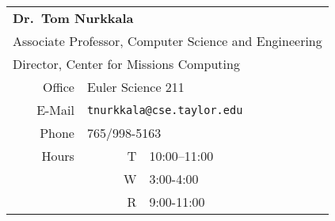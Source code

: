 \begin{tabular}{rrl}
  \toprule
  \multicolumn{3}{l}{\textbf{Dr.\ Tom Nurkkala}}                            \\
  \multicolumn{3}{l}{Associate Professor, Computer Science and Engineering} \\
  \multicolumn{3}{l}{Director, Center for Missions Computing}               \\
  \midrule
  Office & \multicolumn{2}{l}{Euler Science 211}                            \\
  E-Mail & \multicolumn{2}{l}{\texttt{tnurkkala@cse.taylor.edu}}            \\
  Phone  & \multicolumn{2}{l}{765/998-5163}                                 \\
  Hours  & T & 10:00--11:00                                                 \\
         & W & 3:00-4:00                                                    \\
         & R & 9:00-11:00                                                   \\
  \bottomrule
\end{tabular}

